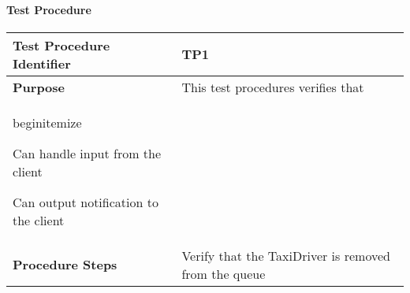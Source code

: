 \paragraph{Test Procedure}
\begin{tabular}{l | l}
	\hline
	\textbf{Test Procedure Identifier} & TP1 \\
	\hline
	\textbf{Purpose} & This test procedures verifies that
	\\begin{itemize}
		\item Can handle input from the client
		\item Can output notification to the client
	\end{itemize}\\
	\hline
	\textbf{Procedure Steps} & Verify that the TaxiDriver is removed from the queue \\
	\hline
\end{tabular}
